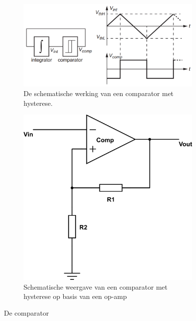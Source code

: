 \documentclass{report}
\begin{document}
\begin{figure}[H]
	\centering
	\begin{subfigure}{0.5\textwidth}
		\centering
		\includegraphics[width=\textwidth]{comparator-werking.png}
		\caption{De schematische werking van een comparator met hysterese. \cite{epo2-opamps}}
		\label{fig:comp-werk}
	\end{subfigure}
	\begin{subfigure}{0.4\textwidth}
		\centering
		\includegraphics[width=\textwidth]{comparator.png}
		\caption{Schematische weergave van een comparator met hysterese op basis van een op-amp}
		\label{fig:comp-schem}
	\end{subfigure}
	\caption{De comparator}
	\label{fig:comp}
\end{figure}
\end{document}
